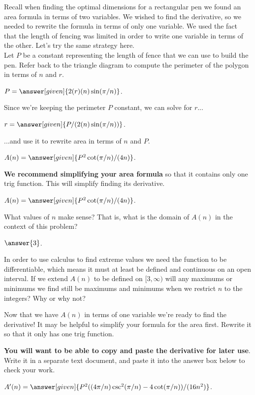 \documentclass[handout,nooutcomes]{ximera}
\begin{document}
\bigskip

\hspace{2cm}Recall when finding the optimal dimensions for a rectangular pen we found an area formula in terms of two variables. We wished to find the derivative, so we needed to rewrite the formula in terms of only one variable. We used the fact that the length of fencing was limited in order to write one variable in terms of the other. Let's try the same strategy here.\\
\hspace{2cm}Let $P$ be a constant representing the length of fence that we can use to build the pen. Refer back to the triangle diagram to compute the perimeter of the polygon in terms of $n$ and $r$.

\begin{problem}
$P = \answer[given]{2(r)(n)\sin(\pi/n)}$.

Since we're keeping the perimeter $P$ constant, we can solve for $r$...

$r = \answer[given]{P/(2(n)\sin(\pi/n))}$.

...and use it to rewrite area in terms of $n$ and $P$.

$A(n) = \answer[given]{P^2\cot(\pi/n)/(4n)}$.

\textbf{We recommend simplifying your area formula} so that it contains only one trig function. This will simplify finding its derivative.

$A(n) = \answer[given]{P^2\cot(\pi/n)/(4n)}$.

\bigskip

What values of $n$ make sense? That is, what is the domain of $A(n)$ in the context of this problem? 

  $\answer{3}$.

\begin{freeResponse}
In order to use calculus to find extreme values we need the function to be differentiable, which means it must at least be defined and continuous on an open interval. If we extend $A(n)$ to be defined on $[3,\infty)$ will any maximums or minimums we find still be maximums and minimums when we restrict $n$ to the integers? Why or why not?
\end{freeResponse}

\bigskip

\hspace{2cm}Now that we have $A(n)$ in terms of one variable we're ready to find the derivative! It may be helpful to simplify your formula for the area first. Rewrite it so that it only has one trig function.

\textbf{You will want to be able to copy and paste the derivative for later use}. Write it in a separate text document, and paste it into the answer box below to check your work.

$A'(n) = \answer[given]{P^2((4\pi/n)\csc^2(\pi/n)-4\cot(\pi/n))/(16n^2)}$.

\end{problem}
\end{document}
